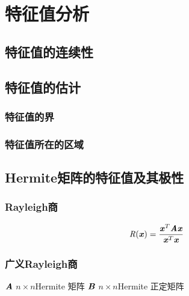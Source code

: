 \chapter{特征值分析}
\label{cha:特征值分析}

\section{特征值的连续性}
\label{sec:特征值的连续性}

\section{特征值的估计}
\label{sec:特征值的估计}

\subsection{特征值的界}
\label{sub:特征值的界}

\subsection{特征值所在的区域}
\label{sub:特征值所在的区域}

\section{Hermite矩阵的特征值及其极性}
\label{sec:Hermite矩阵的特征值及其极性}

\subsection{Rayleigh商}
\label{sub:Rayleigh商}

\begin{definition}[Rayleigh商]
    $$
    \mathit{R}(\boldsymbol{\mathit{x}}) = \frac{\boldsymbol{\mathit{x}}^T \boldsymbol{\mathit{A}} \boldsymbol{\mathit{x}}}{\boldsymbol{\mathit{x}}^T\boldsymbol{\mathit{x}}}
    $$
\end{definition}

\subsection{广义Rayleigh商}
\label{sub:广义Rayleigh商}


$\boldsymbol{\mathit{A}}$ $n \times n$Hermite 矩阵
$\boldsymbol{\mathit{B}}$ $n \times n$Hermite 正定矩阵

